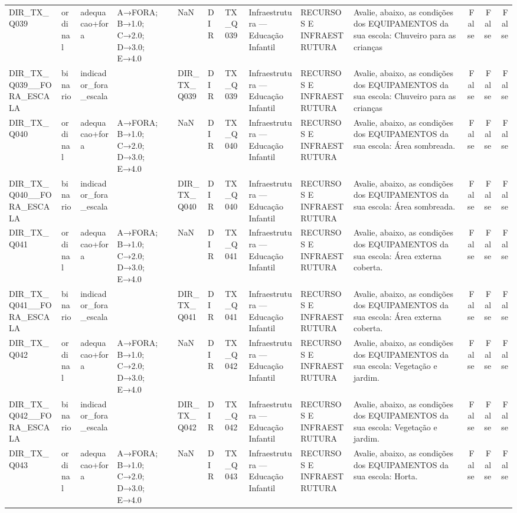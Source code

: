 \begin{tabular}{llllllllllrrr}
DIR\_TX\_Q039 & ordinal & adequacao+fora & A→FORA; B→1.0; C→2.0; D→3.0; E→4.0 & NaN & DIR & TX\_Q039 & Infraestrutura — Educação Infantil & RECURSOS E INFRAESTRUTURA & Avalie, abaixo, as condições dos EQUIPAMENTOS da sua escola:  Chuveiro para as crianças & False & False & False \\
DIR\_TX\_Q039\_\_FORA\_ESCALA & binario & indicador\_fora\_escala &  & DIR\_TX\_Q039 & DIR & TX\_Q039 & Infraestrutura — Educação Infantil & RECURSOS E INFRAESTRUTURA & Avalie, abaixo, as condições dos EQUIPAMENTOS da sua escola:  Chuveiro para as crianças & False & False & False \\
DIR\_TX\_Q040 & ordinal & adequacao+fora & A→FORA; B→1.0; C→2.0; D→3.0; E→4.0 & NaN & DIR & TX\_Q040 & Infraestrutura — Educação Infantil & RECURSOS E INFRAESTRUTURA & Avalie, abaixo, as condições dos EQUIPAMENTOS da sua escola: Área sombreada. & False & False & False \\
DIR\_TX\_Q040\_\_FORA\_ESCALA & binario & indicador\_fora\_escala &  & DIR\_TX\_Q040 & DIR & TX\_Q040 & Infraestrutura — Educação Infantil & RECURSOS E INFRAESTRUTURA & Avalie, abaixo, as condições dos EQUIPAMENTOS da sua escola: Área sombreada. & False & False & False \\
DIR\_TX\_Q041 & ordinal & adequacao+fora & A→FORA; B→1.0; C→2.0; D→3.0; E→4.0 & NaN & DIR & TX\_Q041 & Infraestrutura — Educação Infantil & RECURSOS E INFRAESTRUTURA & Avalie, abaixo, as condições dos EQUIPAMENTOS da sua escola: Área externa coberta. & False & False & False \\
DIR\_TX\_Q041\_\_FORA\_ESCALA & binario & indicador\_fora\_escala &  & DIR\_TX\_Q041 & DIR & TX\_Q041 & Infraestrutura — Educação Infantil & RECURSOS E INFRAESTRUTURA & Avalie, abaixo, as condições dos EQUIPAMENTOS da sua escola: Área externa coberta. & False & False & False \\
DIR\_TX\_Q042 & ordinal & adequacao+fora & A→FORA; B→1.0; C→2.0; D→3.0; E→4.0 & NaN & DIR & TX\_Q042 & Infraestrutura — Educação Infantil & RECURSOS E INFRAESTRUTURA & Avalie, abaixo, as condições dos EQUIPAMENTOS da sua escola: Vegetação e jardim. & False & False & False \\
DIR\_TX\_Q042\_\_FORA\_ESCALA & binario & indicador\_fora\_escala &  & DIR\_TX\_Q042 & DIR & TX\_Q042 & Infraestrutura — Educação Infantil & RECURSOS E INFRAESTRUTURA & Avalie, abaixo, as condições dos EQUIPAMENTOS da sua escola: Vegetação e jardim. & False & False & False \\
DIR\_TX\_Q043 & ordinal & adequacao+fora & A→FORA; B→1.0; C→2.0; D→3.0; E→4.0 & NaN & DIR & TX\_Q043 & Infraestrutura — Educação Infantil & RECURSOS E INFRAESTRUTURA & Avalie, abaixo, as condições dos EQUIPAMENTOS da sua escola: Horta. & False & False & False \\

\end{tabular}
